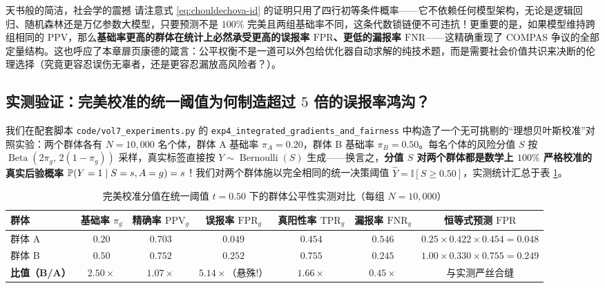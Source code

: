 \begin{insightBox}{天书般的简洁，社会学的震撼}
请注意式 \eqref{eq:chouldechova-id} 的证明只用了四行初等条件概率——它不依赖任何模型架构，无论是逻辑回归、随机森林还是万亿参数大模型，只要预测不是 $100\%$ 完美且两组基础率不同，这条代数锁链便不可违抗！更重要的是，如果模型维持跨组相同的 $\mathrm{PPV}$，那么\textbf{基础率更高的群体在统计上必然承受更高的误报率 $\mathrm{FPR}$、更低的漏报率 $\mathrm{FNR}$}——这精确重现了 COMPAS 争议的全部定量结构。这也呼应了本章扉页康德的箴言：公平权衡不是一道可以外包给优化器自动求解的纯技术题，而是需要社会价值共识来决断的伦理选择（究竟更容忍误伤无辜者，还是更容忍漏放高风险者？）。
\end{insightBox}

\subsection{实测验证：完美校准的统一阈值为何制造超过 $5$ 倍的误报率鸿沟？}

我们在配套脚本 \texttt{code/vol7\_experiments.py} 的 \texttt{exp4\_integrated\_\allowbreak gradients\_and\_fairness} 中构造了一个无可挑剔的“理想贝叶斯校准”对照实验：两个群体各有 $N = 10{,}000$ 名个体，群体 A 基础率 $\pi_A = 0.20$，群体 B 基础率 $\pi_B = 0.50$。每名个体的风险分值 $S$ 按 $\operatorname{Beta}(2\pi_g,\, 2(1-\pi_g))$ 采样，真实标签直接按 $Y \sim \operatorname{Bernoulli}(S)$ 生成——换言之，\textbf{分值 $S$ 对两个群体都是数学上 $100\%$ 严格校准的真实后验概率 $\mathbb{P}(Y=1\mid S=s, A=g) = s$}！我们对两个群体施以完全相同的统一决策阈值 $\hat{Y} = \mathbb{I}[S \ge 0.50]$，实测统计汇总于表 \ref{tab:fairness-sim}。

\begin{table}[htbp]
  \centering
  \caption{完美校准分值在统一阈值 $t=0.50$ 下的群体公平性实测对比（每组 $N = 10{,}000$）}
  \label{tab:fairness-sim}
  \footnotesize
  \begin{tabular}{@{}lcccccc@{}}
    \toprule
    群体 & 基础率 $\pi_g$ & 精确率 $\mathrm{PPV}_g$ & 误报率 $\mathrm{FPR}_g$ & 真阳性率 $\mathrm{TPR}_g$ & 漏报率 $\mathrm{FNR}_g$ & 恒等式预测 $\mathrm{FPR}$ \\
    \midrule
    群体 A & $0.20$ & $0.703$ & $\mathbf{0.049}$ & $0.454$ & $0.546$ & $0.25\!\times\!0.422\!\times\!0.454 = 0.048$ \\
    群体 B & $0.50$ & $0.752$ & $\mathbf{0.252}$ & $0.755$ & $0.245$ & $1.00\!\times\!0.330\!\times\!0.755 = 0.249$ \\
    \midrule
    \textbf{比值（B/A）} & $2.50\times$ & $1.07\times$ & $\mathbf{5.14\times}$（悬殊!） & $1.66\times$ & $0.45\times$ & 与实测严丝合缝 \\
    \bottomrule
  \end{tabular}
\end{table}

